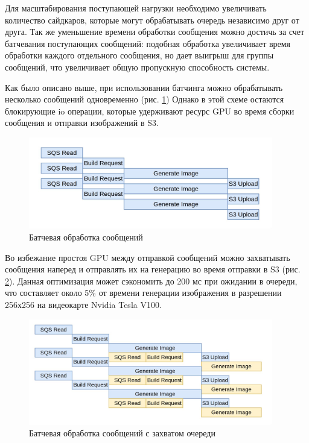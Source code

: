 Для масштабирования поступающей нагрузки необходимо увеличивать количество сайдкаров, которые могут 
обрабатывать очередь независимо друг от друга. Так же уменьшение времени обработки сообщения можно 
достичь за счет батчевания поступающих сообщений: подобная обработка увеличивает время обработки 
каждого отдельного сообщения, но дает выигрыш для группы сообщений, что увеличивает общую
пропускную способность системы.

Как было описано выше, при использовании батчинга можно обрабатывать несколько сообщений одновременно (рис. \ref{fig:flame1})
Однако в этой схеме остаются блокирующие io операции, которые удерживают ресурс GPU во время сборки сообщения и отправки изображений
в S3. 

\begin{footnotesize}

\begin{figure}[H]
  \centering
  \includegraphics[width=0.95\textwidth]{img/flame1.jpg}
  \caption{Батчевая обработка сообщений}
    \label{fig:flame1}
\end{figure}
\end{footnotesize}

Во избежание простоя GPU между отправкой сообщений можно захватывать сообщения наперед
и отправлять их на генерацию во время отправки в S3 (рис. \ref{fig:flame2}).
Данная оптимизация может сэкономить до 200 мс при ожидании в очереди, что составляет
около 5\% от времени генерации изображения в разрешении 256х256 на видеокарте Nvidia Tesla V100.

\begin{footnotesize}
\begin{figure}[H]
  \centering
  \includegraphics[width=0.95\textwidth]{img/flame2.jpg}
  \caption{Батчевая обработка сообщений с захватом очереди}
    \label{fig:flame2}
\end{figure}
\end{footnotesize}
